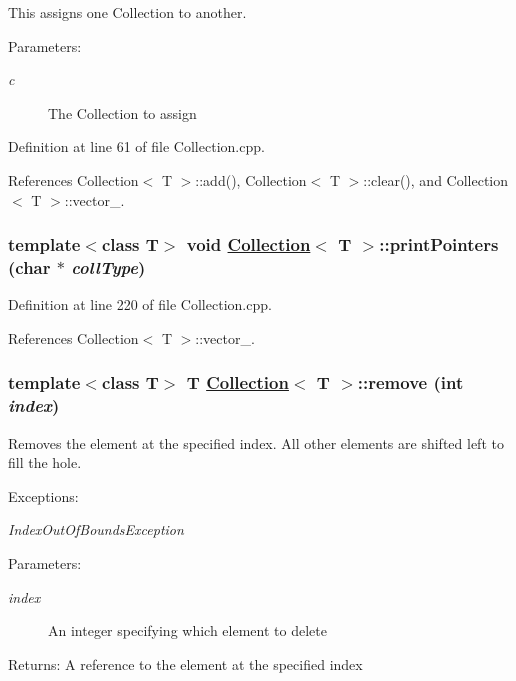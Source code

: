 This assigns one Collection to another. \begin{Desc}
\item[Parameters:]
\begin{description}
\item[{\em c}]The Collection to assign \end{description}
\end{Desc}


Definition at line 61 of file Collection.cpp.

References Collection$<$ T $>$::add(), Collection$<$ T $>$::clear(), and Collection$<$ T $>$::vector\_\-.\hypertarget{classCollection_a13}{
\subsubsection[printPointers]{\setlength{\rightskip}{0pt plus 5cm}template$<$class T$>$ void \hyperlink{classCollection}{Collection}$<$ T $>$::print\-Pointers (char $\ast$ {\em coll\-Type})}}
\label{classCollection_a13}




Definition at line 220 of file Collection.cpp.

References Collection$<$ T $>$::vector\_\-.\hypertarget{classCollection_a8}{
\subsubsection[remove]{\setlength{\rightskip}{0pt plus 5cm}template$<$class T$>$ T \hyperlink{classCollection}{Collection}$<$ T $>$::remove (int {\em index})}}
\label{classCollection_a8}


Removes the element at the specified index. All other elements are shifted left to fill the hole. \begin{Desc}
\item[Exceptions:]
\begin{description}
\item[{\em Index\-Out\-Of\-Bounds\-Exception}]\end{description}
\end{Desc}
\begin{Desc}
\item[Parameters:]
\begin{description}
\item[{\em index}]An integer specifying which element to delete \end{description}
\end{Desc}
\begin{Desc}
\item[Returns:]A reference to the element at the specified index \end{Desc}


